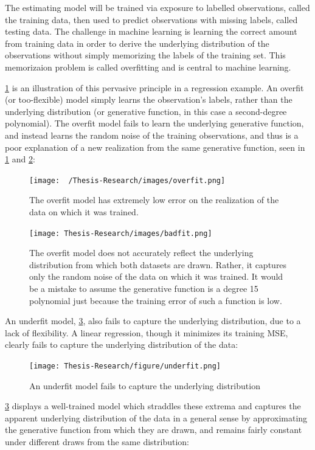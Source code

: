 \documentclass[12pt,twoside]{reedthesis}
\begin{document}
The estimating model will be trained via exposure to labelled
observations, called the training data, then used to predict
observations with missing labels, called testing data. The challenge in
machine learning is learning the correct amount from training data in
order to derive the underlying distribution of the observations without
simply memorizing the labels of the training set. This memorizaion
problem is called overfitting and is central to machine learning.

\ref{fig:overfit} is an illustration of this pervasive principle in a
regression example. An overfit (or too-flexible) model simply learns the
observation's labels, rather than the underlying distribution (or
generative function, in this case a second-degree polynomial). The
overfit model fails to learn the underlying generative function, and
instead learns the random noise of the training observations, and thus
is a poor explanation of a new realization from the same generative
function, seen in \ref{fig:overfit} and \ref{fig:overfitre}:
\begin{figure}
\centering
\texttt{[image: ~/Thesis-Research/images/overfit.png]}
\caption{\label{fig:overfit}The overfit model has extremely low error on the
realization of the data on which it was trained.}
\end{figure}
\begin{figure}
\centering
\texttt{[image: Thesis-Research/images/badfit.png]}
\caption{\label{fig:overfitre}The overfit model does not accurately reflect
the underlying distribution from which both datasets are drawn. Rather,
it captures only the random noise of the data on which it was trained.
It would be a mistake to assume the generative function is a degree 15
polynomial just because the training error of such a function is low.}
\end{figure}
An underfit model, \ref{fig:underfit}, also fails to capture the
underlying distribution, due to a lack of flexibility. A linear
regression, though it minimizes its training MSE, clearly fails to
capture the underlying distribution of the data:
\begin{figure}
\centering
\texttt{[image: Thesis-Research/figure/underfit.png]}
\caption{\label{fig:underfit}An underfit model fails to capture the
underlying distribution}
\end{figure}
\ref{fig:underfit} displays a well-trained model which straddles these
extrema and captures the apparent underlying distribution of the data in
a general sense by approximating the generative function from which they
are drawn, and remains fairly constant under different draws from the
same distribution:
\end{document}
